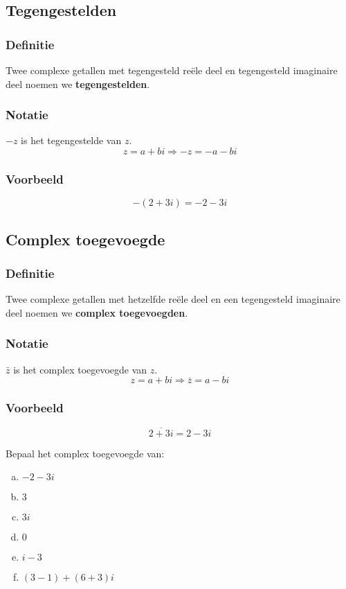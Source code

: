 \documentclass[12pt,twoside,a4paper]{article}
\begin{document}
\needspace{6cm}
\subsection{Tegengestelden}

\subsubsection*{Definitie}
\begin{mdframed}
Twee complexe getallen met tegengesteld reële deel en tegengesteld imaginaire deel noemen we {\bf tegengestelden}.
\end{mdframed}

\subsubsection*{Notatie}
$-z$ is het tegengestelde van $z$.
\[z=a+bi \Rightarrow -z=-a-bi\]

\subsubsection*{Voorbeeld}
$$-(2+3i)=-2-3i$$

\subsection{Complex toegevoegde}

\subsubsection*{Definitie}
\begin{mdframed}
Twee complexe getallen met hetzelfde reële deel en een tegengesteld imaginaire deel noemen we {\bf complex toegevoegden}.
\end{mdframed}

\subsubsection*{Notatie}
$\bar{z}$ is het complex toegevoegde van $z$.
\[z=a+bi \Rightarrow \overline{z}=a-bi\]

\subsubsection*{Voorbeeld}
$$\overline{2+3i}=2-3i$$

\begin{oefening}
Bepaal het complex toegevoegde van:
\begin{multicols}{2}
\begin{enumerate}[(a)]
  \item $-2-3i$
  \item $3$
  \item $3i$
  \item $0$
  \item $i-3$
  \item $(3-1)+(6+3)i$
\end{enumerate}
\end{multicols}
\end{oefening}
\end{document}
